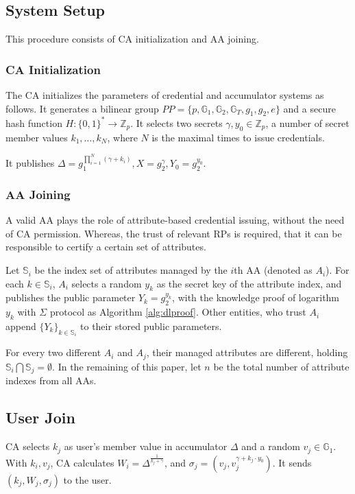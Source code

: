 \documentclass[journal]{IEEEtran}
\begin{document}
	\subsection{System Setup}
	This procedure consists of CA initialization and AA joining. 
	\subsubsection{CA Initialization}
	The CA initializes the parameters of credential and accumulator systems as follows. It generates a bilinear group $PP=\{p, \mathbb{G}_1, \mathbb{G}_2, \mathbb{G}_T, g_1, g_2, e\}$ and a secure hash function $H:\{0,1\}^*\rightarrow \mathbb{Z}_p$. It selects two secrets $\gamma, y_0\in \mathbb{Z}_p$, a number of secret member values $k_1, \dots, k_N$, where $N$ is the maximal times to issue credentials.
	
	It publishes $\Delta = g_1^{\prod_{i=1}^{N}(\gamma+k_i)}, X= g_2^\gamma, Y_0= g_2^{y_0}$.
	\subsubsection{AA Joining}
	A valid AA plays the role of attribute-based credential issuing, without the need of CA permission. Whereas, the trust of relevant RPs is required, that it can be responsible to certify a certain set of attributes.
	
	Let $\mathbb{S}_i$ be the index set of attributes managed by the $i$th AA (denoted as $A_i$). For each $k\in \mathbb{S}_i$, $A_i$ selects a random $y_k$ as the secret key of the attribute index, and publishes the public parameter $Y_k = g_2^{y_k}$, with the knowledge proof of logarithm $y_k$ with $\Sigma$ protocol as Algorithm \ref{alg:dlproof}. 
	Other entities, who trust $A_i$ append $\{Y_k\}_{k\in \mathbb{S}_i}$ to their stored public parameters.
	
	For every two different $A_i$ and $A_j$, their managed attributes are different, holding $\mathbb{S}_i \bigcap \mathbb{S}_j = \emptyset$. In the remaining of this paper, let $n$ be the total number of attribute indexes from all AAs.
	\subsection{User Join}
	CA selects $k_j$ as user's member value in accumulator $\Delta$ and a random $v_j \in \mathbb{G}_1$. With $k_i, v_j$, CA calculates $W_i = \Delta^{\frac{1}{k_j + \gamma}}$, and $\sigma_j = (v_j, v_j^{\gamma+ k_j\cdot y_0})$. It sends $(k_j, W_j, \sigma_j)$ to the user. 
	
\end{document}
